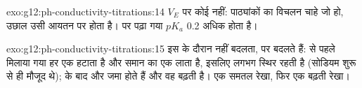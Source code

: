 \begin{solution}{exo:g12:ph-conductivity-titrations:14}
$V_E$ पर कोई नहीं: पाठ्यांकों का विचलन चाहे जो हो, उछाल उसी आयतन पर
होता है।  पर पढ़ा गया $pK_a$ 0.2 अधिक होता है।
\end{solution}

\begin{solution}{exo:g12:ph-conductivity-titrations:15}
इस  के दौरान  नहीं बदलता, पर  बदलते हैं:
 से पहले मिलाया गया हर  एक  हटाता है और समान  का
एक  लाता है, इसलिए  लगभग
स्थिर रहती है (सोडियम  शुरू से ही मौजूद थे);  के बाद  और 
जमा होते हैं और वह बढ़ती है। एक समतल रेखा, फिर एक बढ़ती रेखा।
\end{solution}

